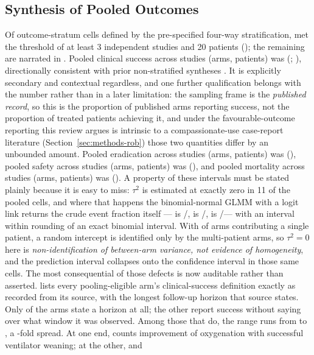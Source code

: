 \subsection{Synthesis of Pooled Outcomes}
\label{sec:results-synthesis}

Of \CellsTotal outcome-stratum cells defined by the pre-specified four-way stratification, \CellsPooled met the threshold of at least 3 independent studies and 20 patients (); the remaining \CellsNotPooled are narrated in . Pooled clinical success across \CsOverallK studies (\CsOverallArms arms, \CsOverallN patients) was \CsOverallEst (\CsOverallCI; ), directionally consistent with prior non-stratified syntheses \parencite{ElHaddad2019_eskape,Uyttebroek2022_lancetid,Liu2025_ijaa}. It is explicitly secondary and contextual regardless, and one further qualification belongs with the number rather than in a later limitation: the sampling frame is the \emph{published record}, so this is the proportion of published arms reporting success, not the proportion of treated patients achieving it, and under the favourable-outcome reporting this review argues is intrinsic to a compassionate-use case-report literature (Section~\ref{sec:methods-rob}) those two quantities differ by an unbounded amount. Pooled eradication across \EradOverallK studies (\EradOverallArms arms, \EradOverallN patients) was \EradOverallEst (\EradOverallCI), pooled safety across \SafOverallK studies (\SafOverallArms arms, \SafOverallN patients) was \SafOverallEst (\SafOverallCI), and pooled mortality across \MortOverallK studies (\MortOverallArms arms, \MortOverallN patients) was \MortOverallEst (\MortOverallCI). A property of these intervals must be stated plainly because it is easy to miss: $\tau^2$ is estimated at exactly zero in 11 of the \CellsPooled pooled cells, and where that happens the binomial-normal GLMM with a logit link returns the crude event fraction itself --- \CsOverallEst is \CsOverallEvents/\CsOverallN, \SafOverallEst is \SafOverallEvents/\SafOverallN, \MortOverallEst is \MortOverallEvents/\MortOverallN --- with an interval within rounding of an exact binomial interval. With \SinglePatientArms of \ArmsAnalysed arms contributing a single patient, a random intercept is identified only by the \MultiPatientArms multi-patient arms, so $\tau^2=0$ here is \emph{non-identification of between-arm variance, not evidence of homogeneity}, and the prediction interval collapses onto the confidence interval in those same cells. The most consequential of those defects is now auditable rather than asserted.  lists every pooling-eligible arm's clinical-success definition exactly as recorded from its source, with the longest follow-up horizon that source states. Only \FollowUpStated of the \ArmsAnalysed arms state a horizon at all; the other \FollowUpNotStated report success without saying over what window it was observed. Among those that do, the range runs from \FollowUpMin to \FollowUpMax , a \FollowUpFold -fold spread. At one end, \textcite{Maddocks2019_ajrccm} counts improvement of oxygenation with successful ventilator weaning; at the other, \textcite{Arya2026_pji_natcomms} and \textcite{Cesta2023_ofid} 